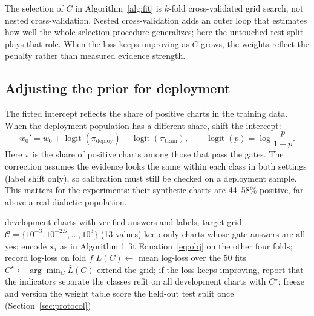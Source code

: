 \documentclass[10pt,letterpaper]{article}
\begin{document}
The selection of $C$ in Algorithm~\ref{alg:fit} is $k$-fold cross-validated grid search, not nested cross-validation. Nested cross-validation adds an outer loop that estimates how well the whole selection procedure generalizes; here the untouched test split plays that role. When the loss keeps improving as $C$ grows, the weights reflect the penalty rather than measured evidence strength.

\FloatBarrier
\subsection{Adjusting the prior for deployment}

The fitted intercept reflects the share of positive charts in the training data. When the deployment population has a different share, shift the intercept:
\begin{equation}
w_0'=w_0+\operatorname{logit}(\pi_{\text{deploy}})-\operatorname{logit}(\pi_{\text{train}}),\qquad \operatorname{logit}(p)=\log\frac{p}{1-p}.
\end{equation}
Here $\pi$ is the share of positive charts among those that pass the gates. The correction assumes the evidence looks the same within each class in both settings (label shift only), so calibration must still be checked on a deployment sample. This matters for the experiments: their synthetic charts are 44--58\% positive, far above a real diabetic population.

\begin{algorithm}[h]
\caption{Fitting the weight table on the development split}\label{alg:fit}
\begin{algorithmic}[1]
\Require development charts with verified answers and labels; target grid $\mathcal{C}=\{10^{-3},10^{-2.5},\dots,10^{3}\}$ (13 values)
\State keep only charts whose gate answers are all yes; encode $\mathbf{x}_i$ as in Algorithm 1
   
      \State fit Equation~\eqref{eq:obj} on the other four folds; record log-loss on fold $f$
    \EndFor
  \EndFor
  \State $\bar L(C)\gets$ mean log-loss over the 50 fits
\EndFor
\State $C^\star\gets\arg\min_C \bar L(C)$ 
  \State extend the grid; if the loss keeps improving, report that the indicators separate the classes
\EndIf
\State refit on all development charts with $C^\star$; freeze and version the weight table
\State score the held-out test split once (Section~\ref{sec:protocol})
\end{algorithmic}
\end{algorithm}
\end{document}
